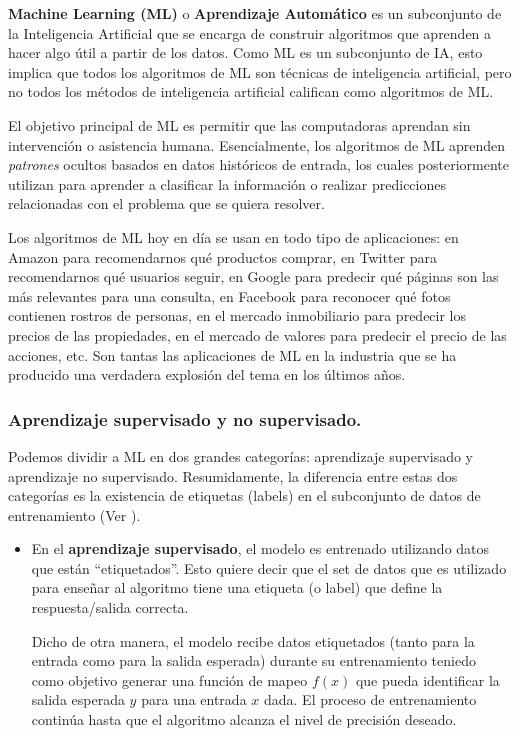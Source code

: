 \documentclass[12pt,a4paper]{article}
\begin{document}
\begin{sloppypar}
\textbf{Machine Learning (ML)} o \textbf{Aprendizaje Automático} es un subconjunto de la Inteligencia Artificial que se encarga de construir algoritmos que aprenden a hacer algo útil a partir de los datos. 
Como ML es un subconjunto de IA, esto implica que todos los algoritmos de ML son técnicas de inteligencia artificial, pero no todos los métodos de inteligencia artificial califican como algoritmos de ML.

El objetivo principal de ML es permitir que las computadoras aprendan sin intervención o asistencia humana.
Esencialmente, los algoritmos de ML aprenden \textit{patrones} ocultos basados en datos históricos de entrada, los cuales posteriormente utilizan para aprender a clasificar la información o realizar predicciones relacionadas con el problema que se quiera resolver. 

Los algoritmos de ML hoy en día se usan en todo tipo de aplicaciones: en Amazon para recomendarnos qué productos comprar, en Twitter para recomendarnos qué usuarios seguir, en Google para predecir qué páginas son las más relevantes para una consulta, en Facebook para reconocer qué fotos contienen rostros de personas, en el mercado inmobiliario para predecir los precios de las propiedades, en el mercado de valores para predecir el precio de las acciones, etc. Son tantas las aplicaciones de ML en la industria que se ha producido una verdadera explosión del tema en los últimos años\cite{apunte_uba}.

\cleardoublepage
\subsubsection{Aprendizaje supervisado y no supervisado.}

Podemos dividir a ML en dos grandes categorías: aprendizaje supervisado y aprendizaje no supervisado. Resumidamente, la diferencia entre estas dos categorías es la existencia de etiquetas (labels) en el subconjunto de datos de entrenamiento (Ver \textit{}).

\begin{itemize}
\item En el \textbf{aprendizaje supervisado}\cite{intro_clasificacion_ML}, el modelo es entrenado utilizando datos que están “etiquetados”. Esto quiere decir que el set de datos que es utilizado para enseñar al algoritmo tiene una etiqueta (o label) que define la respuesta/salida correcta. 

Dicho de otra manera, el modelo recibe datos etiquetados (tanto para la entrada como para la salida esperada) durante su entrenamiento teniedo como objetivo generar una función de mapeo $f(x)$ que pueda identificar la salida esperada $y$ para una entrada $x$ dada. El proceso de entrenamiento continúa hasta que el algoritmo alcanza el nivel de precisión deseado. 


\end{itemize}
\end{sloppypar}
\end{document}

